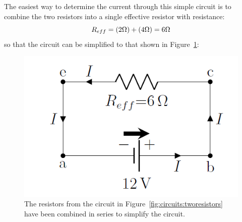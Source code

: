 \begin{framed}
\begin{framed}
The easiest way to determine the current through this simple circuit is to combine the two resistors into a single effective resistor with resistance:
\begin{equation}
R_{eff}=(2 {\rm \Omega})+(4 {\rm \Omega})=6 {\rm \Omega}
\end{equation}
so that the circuit can be simplified to that shown in Figure~\ref{fig:circuits:batteryresistor2}:

\begin{figure}[!htbp]
\centering
\includegraphics[width=0.42\linewidth]{files/batteryresistor2-ec040ff635391cdcdeeaef863ed15370.png}
\caption[]{The resistors from the circuit in Figure~\ref{fig:circuits:tworesistors} have been combined in series to simplify the circuit.}
\label{fig:circuits:batteryresistor2}
\end{figure}


\end{framed}
\end{framed}
